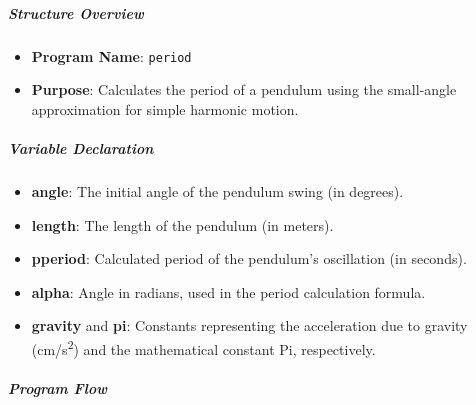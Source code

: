 \subparagraph{Structure Overview}

\begin{itemize}
\item \textbf{Program Name}: \texttt{period}
\item \textbf{Purpose}: Calculates the period of a pendulum using the small-angle approximation for simple harmonic motion.
\end{itemize}

\subparagraph{Variable Declaration}

\begin{itemize}
\item \textbf{angle}: The initial angle of the pendulum swing (in degrees).
\item \textbf{length}: The length of the pendulum (in meters).
\item \textbf{pperiod}: Calculated period of the pendulum's oscillation (in seconds).
\item \textbf{alpha}: Angle in radians, used in the period calculation formula.
\item \textbf{gravity} and \textbf{pi}: Constants representing the acceleration due to gravity (cm/s\textsuperscript{2}) and the mathematical constant Pi, respectively.
\end{itemize}

\subparagraph{Program Flow}

